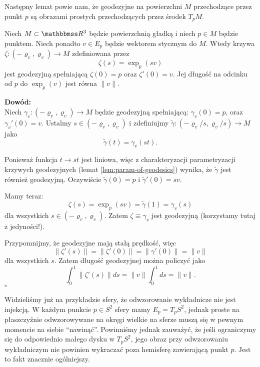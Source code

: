 \begin{frame}
\begin{center}

\end{center}

\end{frame}
Następny lemat powie nam, że geodezyjne na powierzchni $M$ przechodzące 
przez punkt $p$ są obrazami prostych przechodzących przez środek $T_pM$.
\begin{frame}

\begin{lemat}
Niech $M\subset \R^3$ będzie powierzchnią gładką i niech $p\in M$ będzie punktem. Niech ponadto $v\in E_p$ będzie wektorem stycznym do $M$. Wtedy krzywa $\zeta\colon(-\varrho_v,\varrho_v)\to M$ zdefiniowana przez
\[\zeta(s)=\exp_p(sv)\] jest geodezyjną spełniającą $\zeta(0)=p$ oraz $\zeta'(0)=v$. Jej długość na odcinku od $p$ do $\exp_p(v)$ jest równa $\|v\|$.
\end{lemat}


\textcolor{ared}{\textbf{Dowód: }}\\\pause 
Niech $\gamma_v\colon (-\varrho_v,\varrho_v)\to M$ będzie geodezyjną spełniającą: $\gamma_v(0)=p$, oraz $\gamma_v'(0)=v$. Ustalmy $s\in (-\varrho_v,\varrho_v)$ i zdefiniujmy $\widetilde{\gamma}\colon(-\varrho_v/s,\varrho_v/s)\to M$ jako \[\widetilde{\gamma}(t)=\gamma_v(st).\]

\end{frame}
\begin{frame}
Ponieważ funkcja $t\to st$ jest liniowa, więc z charakteryzacji parametryzacji krzywych geodezyjnych (lemat \ref{lem:param-of-geodesics}) wynika, że $\widetilde{\gamma}$ jest również geodezyjną. Oczywiście $\widetilde{\gamma}(0)=p$ i $\widetilde{\gamma}'(0)=sv$.

\pause Mamy teraz:
\[\zeta(s)=\exp_p(sv)=\widetilde{\gamma}(1)=\gamma_v(s)\]
dla wszystkich $s\in (-\varrho_v, \varrho_v)$. Zatem $\zeta\equiv\gamma_v$ jest geodezyjną (korzystamy tutaj z jedyności!).

\pause Przypomnijmy, że geodezyjne mają stałą prędkość, więc
\[\|\zeta'(s)\|=\|\zeta'(0)\|=\|\gamma'(0)\|=\|v\|\]dla wszystkich $s$. Zatem długość geodezyjnej można policzyć jako
\[\int_0^1\|\zeta'(s)\|ds=\|v\|\int_0^1ds=\|v\|.\]
\hfill $\square$

\end{frame}

Widzieliśmy już na przykładzie sfery, że odwzorowanie wykładnicze nie jest injekcją. W każdym punkcie $p\in S^2$ sfery mamy $E_p=T_pS^2$, jednak proste na płaszczyźnie odwzorowywane na okręgi wielkie na sferze muszą się w pewnym momencie na siebie ``nawinąć''. Powinniśmy jednak zauważyć, że jeśli ograniczymy się do odpowiednio małego dysku w $T_pS^2$, jego obraz przy odwzorowaniu wykładniczym nie powinien wykraczać poza hemisferę zawierającą punkt $p$. Jest to fakt znacznie ogólniejszy.


